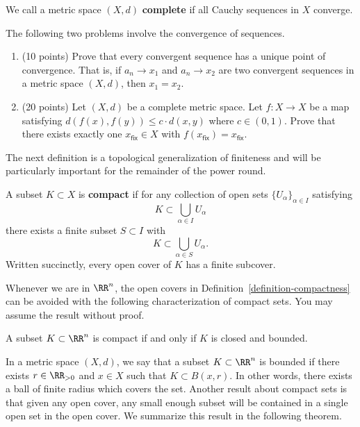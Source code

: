 \documentclass[11pt]{article}
\begin{document}
    \begin{defn}\label{definition-complete}
        We call a metric space $(X, d)$ \textbf{complete} if all Cauchy sequences in $X$ converge. 
    \end{defn}
    \begin{prob} [30 points] The following two problems involve the convergence of sequences. 
        \begin{enumerate}[label = (\alph*)]
            \item (10 points) Prove that every convergent sequence has a unique point of convergence. That is, if $a_n \to x_1$ and $a_n \to x_2$ are two convergent sequences in a metric space $(X, d)$, then $x_1 = x_2$.
            \item (20 points) Let $(X, d)$ be a complete metric space. Let $f : X \to X$ be a map satisfying $d(f(x), f(y)) \leq c \cdot d(x, y)$ where $c \in (0, 1)$. Prove that there exists exactly one $x_{\mathsf{fix}} \in X$ with $f(x_{\mathsf{fix}}) = x_{\mathsf{fix}}$. 
        \end{enumerate}
    \end{prob}
     
    The next definition is a topological generalization of finiteness and will be particularly important for the remainder of the power round.

    \begin{defn}\label{definition-compactness}
        A subset $K \subset X$ is \textbf{compact} if for any collection of open sets $\{U_\alpha\}_{\alpha \in I}$ satisfying
        \[
            K \subset \bigcup_{\alpha \in I} U_\alpha
        \] 
        there exists a finite subset $S \subset I$ with 
        \[
            K \subset \bigcup_{\alpha \in S} U_\alpha.
        \]  
        Written succinctly, every open cover of $K$ has a finite subcover. 
    \end{defn}

    Whenever we are in $\RR^n$, the open covers in Definition~\ref{definition-compactness} can be avoided with the following characterization of compact sets. You may assume the result without proof. 

    \begin{thm} \label{theorem-heine-borel}
        A subset $K \subset \RR^n$ is compact if and only if $K$ is closed and bounded.  
    \end{thm}

    In a metric space $(X, d)$, we say that a subset $K \subset \RR^n$ is bounded if there exists $r \in \RR_{> 0}$ and $x \in X$ such that $K \subset B(x, r)$. In other words, there exists a ball of finite radius which covers the set. Another result about compact sets is that given any open cover, any small enough subset will be contained in a single open set in the open cover. We summarize this result in the following theorem. 
\end{document}
